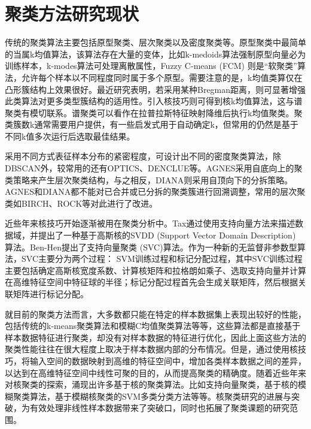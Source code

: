 \section{聚类方法研究现状}
传统的聚类算法主要包括原型聚类、层次聚类以及密度聚类等。原型聚类中最简单的当属k均值算法，该算法存在大量的变体，比如k-medoids算法强制原型向量必为训练样本，k-modes算法可处理离散属性，Fuzzy C-means (FCM) 则是“软聚类”算法，允许每个样本以不同程度同时属于多个原型。需要注意的是，k均值类算仅在凸形簇结构上效果很好。最近研究表明，若采用某种Bregman距离，则可显著增强此类算法对更多类型簇结构的适用性。引入核技巧则可得到核k均值算法，这与谱聚类有模切联系。谱聚类可以看作在拉普拉斯特征映射降维后执行k均值聚类。聚类簇数k通常需要用户提供，有一些启发式用于自动确定k，但常用的仍然是基于不同k值多次运行后选取最佳结果。

采用不同方式表征样本分布的紧密程度，可设计出不同的密度聚类算法，除DBSCAN外，较常用的还有OPTICS、DENCLUE等。AGNES采用自底向上的聚类策略来产生层次聚类结构，与之相反，DIANA则采用自顶向下的分拆策略。AGNES和DIANA都不能对已合并或已分拆的聚类簇进行回溯调整，常用的层次聚类如BIRCH、ROCK等对此进行了改进。

近些年来核技巧开始逐渐被用在聚类分析中。Tax通过使用支持向量方法来描述数据域，并提出了一种基于高斯核的SVDD (Support Vector Domain Description) 算法。Ben-Hen提出了支持向量聚类 (SVC)算法。作为一种新的无监督非参数型算法，SVC主要分为两个过程： SVM训练过程和标记分配过程，其中SVC训练过程主要包括确定高斯核宽度系数、计算核矩阵和拉格朗如乘子、选取支持向量并计算在高维特征空间中特征球的半径；标记分配过程首先会生成关联矩阵，然后根据关联矩阵进行标记分配。

就目前的聚类方法而言，大多数都只能在特定的样本数据集上表现出较好的性能，包括传统的k-means聚类算法和模糊C均值聚类算法等等，这些算法都是直接基于样本数据特征进行聚类，却没有对样本数据的特征进行优化，因此上面这些方法的聚类性能往往在很大程度上取决于样本数据内部的分布情况。但是，通过使用核技巧，将输入空间的数据映射到高维的特征空间中，增加各类样本数据之间的差异，以达到在高维特征空间中线性可聚的目的，从而提高聚类的精确度。随着近些年来对核聚类的探索，涌现出许多基于核的聚类算法。比如支持向量聚类，基于核的模糊聚类算法，基于模糊核聚类的SVM多类分类方法等等。核聚类研究的进展与突破，为有效处理非线性样本数据带来了突破口，同时也拓展了聚类课题的研究范围。

